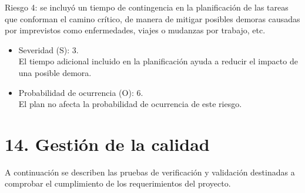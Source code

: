 \documentclass[
11pt, %
]{charter}
\begin{document}
Riesgo 4: se incluyó un tiempo de contingencia en la planificación de las tareas que conforman el camino crítico, de manera de mitigar posibles demoras causadas por imprevistos como enfermedades, viajes o mudanzas por trabajo, etc.
\begin{itemize}
	\item Severidad (S): 3. \\
	El tiempo adicional incluido en la planificación ayuda a reducir el impacto de una posible demora.
	\item Probabilidad de ocurrencia (O): 6.\\
	El plan no afecta la probabilidad de ocurrencia de este riesgo.
\end{itemize}   


\section{14. Gestión de la calidad}
\label{sec:calidad}

A continuación se describen las pruebas de verificación y validación destinadas a comprobar el cumplimiento de los requerimientos del proyecto.
\end{document}

